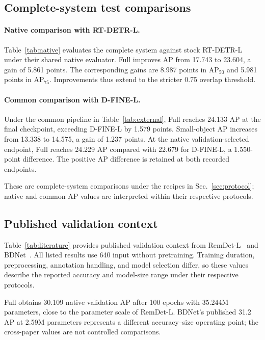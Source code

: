 \subsection{Complete-system test comparisons}
\paragraph{Native comparison with RT-DETR-L.}
Table~\ref{tab:native} evaluates the complete system against stock RT-DETR-L under their shared native evaluator. Full improves AP from 17.743 to 23.604, a gain of 5.861 points. The corresponding gains are 8.987 points in $\mathrm{AP}_{50}$ and 5.981 points in $\mathrm{AP}_{75}$. Improvements thus extend to the stricter 0.75 overlap threshold.


\paragraph{Common comparison with D-FINE-L.}
Under the common pipeline in Table~\ref{tab:external}, Full reaches 24.133 AP at the final checkpoint, exceeding D-FINE-L by 1.579 points. Small-object AP increases from 13.338 to 14.575, a gain of 1.237 points. At the native validation-selected endpoint, Full reaches 24.229 AP compared with 22.679 for D-FINE-L, a 1.550-point difference. The positive AP difference is retained at both recorded endpoints.


These are complete-system comparisons under the recipes in Sec.~\ref{sec:protocol}; native and common AP values are interpreted within their respective protocols.

\subsection{Published validation context}
Table~\ref{tab:literature} provides published validation context from RemDet-L~\cite{li2025remdet} and BDNet~\cite{guan2026bdnet}. All listed results use 640 input without pretraining. Training duration, preprocessing, annotation handling, and model selection differ, so these values describe the reported accuracy and model-size range under their respective protocols.


Full obtains 30.109 native validation AP after 100 epochs with 35.244M parameters, close to the parameter scale of RemDet-L. BDNet's published 31.2 AP at 2.59M parameters represents a different accuracy--size operating point; the cross-paper values are not controlled comparisons.

